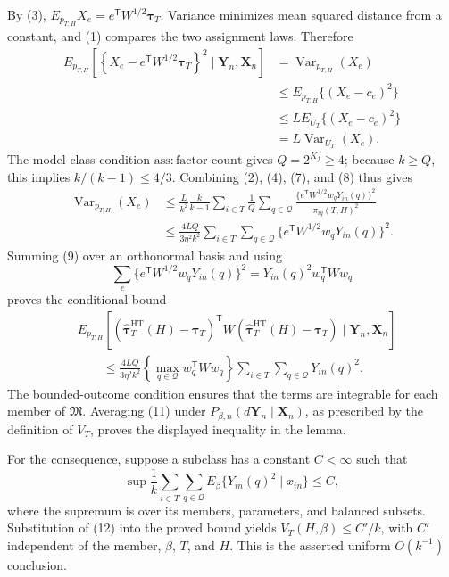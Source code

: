 By (3), \(E_{p_{T,H}}X_e=e^{\mathsf T}W^{1/2}\boldsymbol\tau_T\).  Variance minimizes mean squared distance from a constant, and (1) compares the two assignment laws.  Therefore
\[
\begin{aligned}
E_{p_{T,H}}\!\left[
\left\{X_e-e^{\mathsf T}W^{1/2}\boldsymbol\tau_T\right\}^2
\mid\mathbf Y_n,\mathbf X_n\right]
&=\operatorname{Var}_{p_{T,H}}(X_e)\\
&\leq E_{p_{T,H}}\{(X_e-c_e)^2\}\\
&\leq L E_{U_T}\{(X_e-c_e)^2\}\\
&=L\operatorname{Var}_{U_T}(X_e).
\end{aligned}
\tag{8}
\]
The model-class condition \(\mathrm{ass{:}factor\text{-}count}\) gives \(Q=2^{K_f}\geq4\); because \(k\geq Q\), this implies \(k/(k-1)\leq4/3\).  Combining (2), (4), (7), and (8) thus gives
\[
\begin{aligned}
\operatorname{Var}_{p_{T,H}}(X_e)
&\leq \frac{L}{k^2}\frac{k}{k-1}
\sum_{i\in T}\frac1Q\sum_{q\in\mathcal Q}
\frac{\{e^{\mathsf T}W^{1/2}w_qY_{in}(q)\}^2}{\pi_{iq}(T,H)^2}\\
&\leq \frac{4LQ}{3\eta^2k^2}
\sum_{i\in T}\sum_{q\in\mathcal Q}
\{e^{\mathsf T}W^{1/2}w_qY_{in}(q)\}^2.
\end{aligned}
\tag{9}
\]
Summing (9) over an orthonormal basis and using
\[
\sum_e\{e^{\mathsf T}W^{1/2}w_qY_{in}(q)\}^2
=Y_{in}(q)^2w_q^{\mathsf T}Ww_q
\tag{10}
\]
proves the conditional bound
\[
\begin{aligned}
&E_{p_{T,H}}\!\left[
(\widehat{\boldsymbol\tau}^{\mathrm{HT}}_T(H)-\boldsymbol\tau_T)^{\mathsf T}
W(\widehat{\boldsymbol\tau}^{\mathrm{HT}}_T(H)-\boldsymbol\tau_T)
\mid\mathbf Y_n,\mathbf X_n\right]\\
&\qquad\leq
\frac{4LQ}{3\eta^2k^2}
\left\{\max_{q\in\mathcal Q}w_q^{\mathsf T}Ww_q\right\}
\sum_{i\in T}\sum_{q\in\mathcal Q}Y_{in}(q)^2.
\end{aligned}
\tag{11}
\]
The bounded-outcome condition ensures that the terms are integrable for each member of \(\mathfrak M\).  Averaging (11) under \(P_{\beta,n}(d\mathbf Y_n\mid\mathbf X_n)\), as prescribed by the definition of \(V_T\), proves the displayed inequality in the lemma.

For the consequence, suppose a subclass has a constant \(C<\infty\) such that
\[
\sup\frac1k\sum_{i\in T}\sum_{q\in\mathcal Q}
E_\beta\{Y_{in}(q)^2\mid x_{in}\}\leq C,
\tag{12}
\]
where the supremum is over its members, parameters, and balanced subsets.  Substitution of (12) into the proved bound yields \(V_T(H,\beta)\leq C'/k\), with \(C'\) independent of the member, \(\beta\), \(T\), and \(H\).  This is the asserted uniform \(O(k^{-1})\) conclusion.


